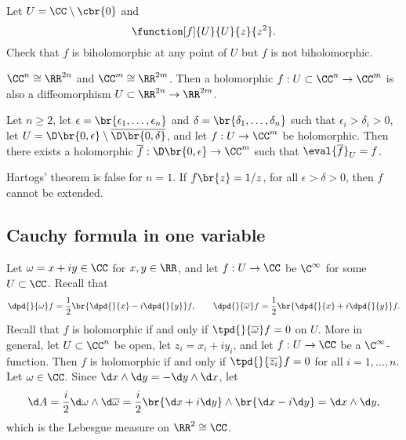 \begin{example}
Let $ U = \CC \setminus \cbr{0} $ and
$$ \function[f]{U}{U}{z}{z^2}. $$
Check that $ f $ is biholomorphic at any point of $ U $ but $ f $ is not biholomorphic.
\end{example}

\begin{remark*}
$ \CC^n \cong \RR^{2n} $ and $ \CC^m \cong \RR^{2m} $. Then a holomorphic $ f : U \subset \CC^n \to \CC^m $ is also a diffeomorphism $ U \subset \RR^{2n} \to \RR^{2m} $.
\end{remark*}

\begin{theorem}[Hartogs]
Let $ n \ge 2 $, let $ \epsilon = \br{\epsilon_1, \dots, \epsilon_n} $ and $ \delta = \br{\delta_1, \dots, \delta_n} $ such that $ \epsilon_i > \delta_i > 0 $, let $ U = \D\br{0, \epsilon} \setminus \overline{\D\br{0, \delta}} $, and let $ f : U \to \CC^m $ be holomorphic. Then there exists a holomorphic $ \overline{f} : \D\br{0, \epsilon} \to \CC^m $ such that $ \eval{\overline{f}}_U = f $.
\end{theorem}

\begin{example*}
Hartogs' theorem is false for $ n = 1 $. If $ f\br{z} = 1 / z $, for all $ \epsilon > \delta > 0 $, then $ f $ cannot be extended.
\end{example*}

\subsection{Cauchy formula in one variable}


Let $ \omega = x + iy \in \CC $ for $ x, y \in \RR $, and let $ f : U \to \CC $ be $ \C^\infty $ for some $ U \subset \CC $. Recall that
$$ \dpd{}{\omega}f = \dfrac{1}{2}\br{\dpd{}{x} - i\dpd{}{y}}f, \qquad \dpd{}{\overline{\omega}}f = \dfrac{1}{2}\br{\dpd{}{x} + i\dpd{}{y}}f. $$
Recall that $ f $ is holomorphic if and only if $ \tpd{}{\overline{\omega}}f = 0 $ on $ U $. More in general, let $ U \subset \CC^n $ be open, let $ z_i = x_i + iy_i $, and let $ f : U \to \CC $ be a $ \C^\infty $-function. Then $ f $ is holomorphic if and only if $ \tpd{}{\overline{z_i}}f = 0 $ for all $ i = 1, \dots, n $. Let $ \omega \in \CC $. Since $ \d x \wedge \d y = -\d y \wedge \d x $, let
$$ \d A = \dfrac{i}{2}\d\omega \wedge \d\overline{\omega} = \dfrac{i}{2} \br{\d x + i\d y} \wedge \br{\d x - i\d y} = \d x \wedge \d y, $$
which is the Lebesgue measure on $ \RR^2 \cong \CC $.

